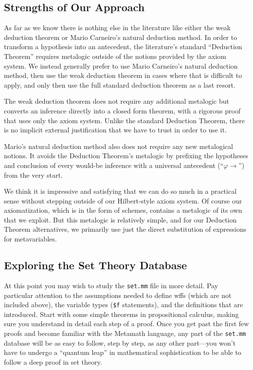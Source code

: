 \subsection{Strengths of Our Approach}

As far as we know there is nothing else in the literature like either the
weak deduction theorem or Mario Carneiro's
natural deduction method.
In order to
transform a hypothesis into an antecedent, the literature's standard
``Deduction Theorem''
requires metalogic outside of the notions provided
by the axiom system. We instead generally prefer to use Mario Carneiro's
natural deduction method, then use the weak deduction theorem in cases
where that is difficult to apply, and only then use the full standard
deduction theorem as a last resort.

The weak deduction theorem
does not require any additional metalogic
but converts an inference directly into a closed form theorem, with
a rigorous proof that uses only the axiom system. Unlike the standard
Deduction Theorem, there is no implicit external justification that we
have to trust in order to use it.

Mario's natural deduction
method also does not require any new metalogical
notions. It avoids the Deduction Theorem's metalogic by prefixing the
hypotheses and conclusion of every would-be inference with a universal
antecedent (``$\varphi \rightarrow$'') from the very start.

We think it is impressive and satisfying that we can do so much in a
practical sense without stepping outside of our Hilbert-style axiom system.
Of course our axiomatization, which is in the form of schemes,
contains a metalogic of its own that we exploit. But this metalogic
is relatively simple, and for our Deduction Theorem alternatives,
we primarily use just the direct substitution of expressions for
metavariables.

\begin{sloppy}
\section{Exploring the Set The\-o\-ry Data\-base}\label{exploring}
\end{sloppy}

At this point you may wish to study the \texttt{set.mm} file in more detail.  Pay particular
attention to the assumptions needed to define wffs (which are not included above), the variable types
(\texttt{\$f} statements), and the
definitions that are introduced.  Start with some simple theorems in
propositional calculus, making sure you understand in detail each step
of a proof.  Once you get past the first few proofs and become familiar
with the Metamath language, any part of the \texttt{set.mm} database
will be as easy to follow, step by step, as any other part---you won't
have to undergo a ``quantum leap'' in mathematical sophistication to be
able to follow a deep proof in set theory.

